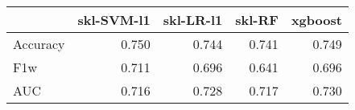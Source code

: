 \begin{tabular}{lrrrr}
\toprule
{} &  skl-SVM-l1 &  skl-LR-l1 &  skl-RF &  xgboost \\
\midrule
Accuracy &       0.750 &      0.744 &   0.741 &    0.749 \\
F1w      &       0.711 &      0.696 &   0.641 &    0.696 \\
AUC      &       0.716 &      0.728 &   0.717 &    0.730 \\
\bottomrule
\end{tabular}
